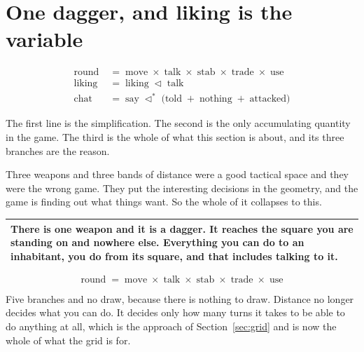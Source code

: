 \documentclass[11pt,a4paper]{article}
\newcommand{\seqb}{\lhd^{\ast}}
\begin{document}
\newpage

\section{One dagger, and liking is the variable}
\label{sec:liking}

\begin{center}
\begin{tcolorbox}[plainbg, colback=pale, width=0.86\textwidth]
\begin{align*}
\text{round}  \;&=\; \text{move} \;\times\; \text{talk} \;\times\; \text{stab} \;\times\; \text{trade} \;\times\; \text{use} \\
\text{liking} \;&=\; \text{liking} \;\lhd\; \text{talk} \\
\text{chat}   \;&=\; \text{say} \;\seqb\; \bigl( \text{told} \;+\; \text{nothing} \;+\; \text{attacked} \bigr)
\end{align*}
\end{tcolorbox}
\end{center}

The first line is the simplification. The second is the only accumulating quantity in the game. The
third is the whole of what this section is about, and its three branches are the reason.


Three weapons and three bands of distance were a good tactical space and they were the wrong game.
They put the interesting decisions in the geometry, and the game is finding out what things
want. So the whole of it collapses to this.

\begin{center}
\begin{tabular}{@{}>{\raggedright\arraybackslash}p{}@{}}
\toprule
\textbf{There is one weapon and it is a dagger. It reaches the square you are standing on and
nowhere else. Everything you can do to an inhabitant, you do from its square, and that includes
talking to it.} \\
\bottomrule
\end{tabular}
\end{center}

\[ \text{round} \;=\; \text{move} \;\times\; \text{talk} \;\times\; \text{stab} \;\times\;
   \text{trade} \;\times\; \text{use} \]

Five branches and no draw, because there is nothing to draw. Distance no longer decides what you
can do. It decides only how many turns it takes to be able to do anything at all, which is the
approach of Section~\ref{sec:grid} and is now the whole of what the grid is for.
\end{document}
